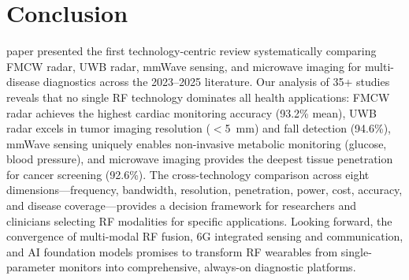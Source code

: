 \documentclass[journal,twoside]{IEEEtran}
\begin{document}
\section{Conclusion}

 paper presented the first technology-centric review systematically comparing FMCW radar, UWB radar, mmWave sensing, and microwave imaging for multi-disease diagnostics across the 2023--2025 literature. Our analysis of 35+ studies reveals that no single RF technology dominates all health applications: FMCW radar achieves the highest cardiac monitoring accuracy (93.2\% mean), UWB radar excels in tumor imaging resolution ($<$5~mm) and fall detection (94.6\%), mmWave sensing uniquely enables non-invasive metabolic monitoring (glucose, blood pressure), and microwave imaging provides the deepest tissue penetration for cancer screening (92.6\%). The cross-technology comparison across eight dimensions---frequency, bandwidth, resolution, penetration, power, cost, accuracy, and disease coverage---provides a decision framework for researchers and clinicians selecting RF modalities for specific applications. Looking forward, the convergence of multi-modal RF fusion, 6G integrated sensing and communication, and AI foundation models promises to transform RF wearables from single-parameter monitors into comprehensive, always-on diagnostic platforms.


\end{document}
